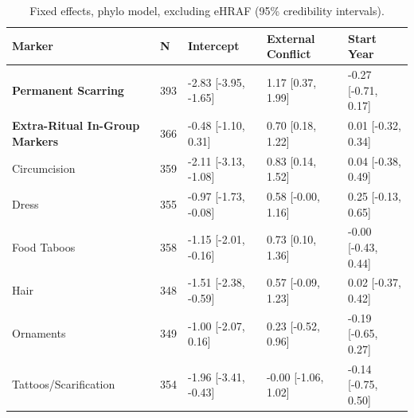 \begin{table}[!ht]
\centering
\small
\caption{Fixed effects, phylo model, excluding eHRAF (95\% credibility intervals).}
\label{tab:extnoehraf_fixed_effects_phylo}
\begin{tabular}{p{4cm}llll}
\toprule
Marker & N & Intercept & External Conflict & Start Year \\
\midrule
\textbf{Permanent Scarring} & 393 & -2.83 [-3.95, -1.65] & 1.17 [0.37, 1.99] & -0.27 [-0.71, 0.17] \\
\textbf{Extra-Ritual In-Group Markers} & 366 & -0.48 [-1.10, 0.31] & 0.70 [0.18, 1.22] & 0.01 [-0.32, 0.34] \\
\midrule
Circumcision & 359 & -2.11 [-3.13, -1.08] & 0.83 [0.14, 1.52] & 0.04 [-0.38, 0.49] \\
Dress & 355 & -0.97 [-1.73, -0.08] & 0.58 [-0.00, 1.16] & 0.25 [-0.13, 0.65] \\
Food Taboos & 358 & -1.15 [-2.01, -0.16] & 0.73 [0.10, 1.36] & -0.00 [-0.43, 0.44] \\
Hair & 348 & -1.51 [-2.38, -0.59] & 0.57 [-0.09, 1.23] & 0.02 [-0.37, 0.42] \\
Ornaments & 349 & -1.00 [-2.07, 0.16] & 0.23 [-0.52, 0.96] & -0.19 [-0.65, 0.27] \\
Tattoos/Scarification & 354 & -1.96 [-3.41, -0.43] & -0.00 [-1.06, 1.02] & -0.14 [-0.75, 0.50] \\
\bottomrule
\end{tabular}
\end{table}